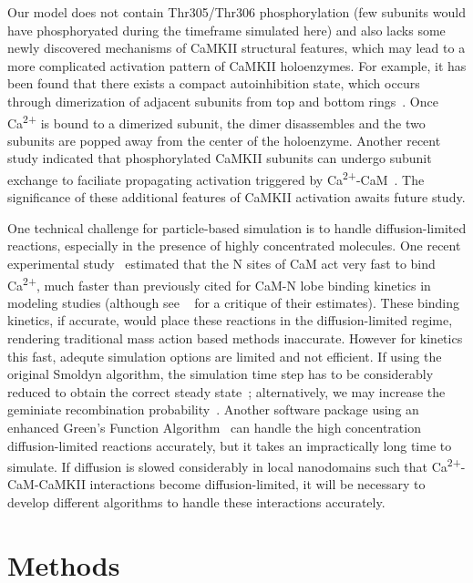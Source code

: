 \documentclass[10pt,letterpaper]{article}
\begin{document}
Our model does not contain Thr305/Thr306 phosphorylation (few subunits would have phosphoryated during the timeframe simulated here) and also lacks some newly discovered mechanisms of CaMKII structural features, which may lead to a more complicated activation pattern of CaMKII holoenzymes. For example, it has been found that there exists a compact autoinhibition state, which occurs through dimerization of adjacent subunits from top and bottom rings~\cite{Chao:2010fn}. Once Ca\textsuperscript{2+} is bound to a dimerized subunit, the dimer disassembles and the two subunits are popped away from the center of the holoenzyme. Another recent study indicated that phosphorylated CaMKII subunits can undergo subunit exchange to faciliate propagating activation triggered by Ca\textsuperscript{2+}-CaM~\cite{Stratton:2014ct}. The significance of these additional features of CaMKII activation awaits future study.

One technical challenge for particle-based simulation is to handle diffusion-limited reactions, especially in the presence of highly concentrated molecules. One recent experimental study~\cite{Faas:2011fna} estimated that the N sites of CaM act very fast to bind Ca\textsuperscript{2+}, much faster than previously cited for CaM-N lobe binding kinetics in modeling studies (although see ~\cite{Mironov:2013} for a critique of their estimates). These binding kinetics, if accurate, would place these reactions in the diffusion-limited regime, rendering traditional mass action based methods inaccurate. 
However for kinetics this fast, adequte simulation options are limited and not efficient. If using the original Smoldyn algorithm, the simulation time step has to be considerably reduced to obtain the correct steady state~\cite{Andrews:2015}; alternatively, we may increase the geminiate recombination probability~\cite{Andrews:2004fs}. Another software package using an enhanced Green's Function Algorithm~\cite{vanZon:2005jd} can handle the high concentration diffusion-limited reactions accurately, but it takes an impractically long time to simulate. If diffusion is slowed considerably in local nanodomains such that Ca\textsuperscript{2+}-CaM-CaMKII interactions become diffusion-limited, it will be necessary to develop different algorithms to handle these interactions accurately.


\section*{Methods}
\end{document}
